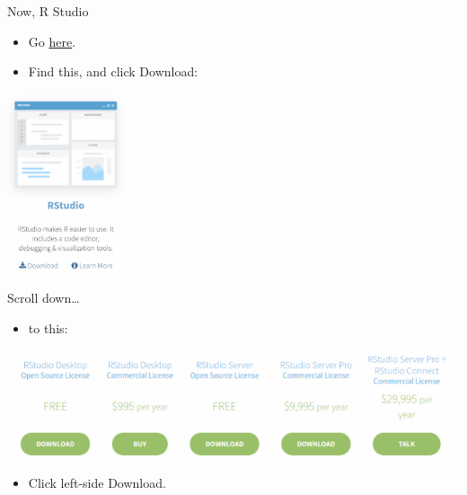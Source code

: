 \documentclass[
  ignorenonframetext,
]{beamer}
\providecommand{\tightlist}{%
  \setlength{\itemsep}{0pt}\setlength{\parskip}{0pt}}
\begin{document}
\begin{frame}{Now, R Studio}
\protect\hypertarget{now-r-studio}{}

\begin{itemize}
\tightlist
\item
  Go \href{https://www.rstudio.com/}{here}.
\item
  Find this, and click Download:
\end{itemize}

\includegraphics[width=\textwidth,height=2.08333in]{rst1.png}

\end{frame}

\begin{frame}{Scroll down\ldots{}}
\protect\hypertarget{scroll-down}{}

\begin{itemize}
\tightlist
\item
  to this:
\end{itemize}

\includegraphics{rstlic.png}

\begin{itemize}
\tightlist
\item
  Click left-side Download.
\end{itemize}

\end{frame}
\end{document}
